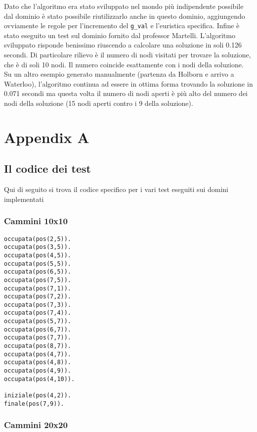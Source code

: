 Dato che l'algoritmo era stato sviluppato nel mondo più indipendente possibile dal dominio è stato possibile riutilizzarlo anche in questo dominio, aggiungendo ovviamente le regole per l'incremento del \lstinline{g_val} e l'euristica specifica. Infine è stato eseguito un test sul dominio fornito dal professor Martelli. L'algoritmo sviluppato risponde benissimo riuscendo a calcolare una soluzione in soli 0.126 secondi. Di particolare rilievo è il numero di nodi visitati per trovare la soluzione, che è di soli 10 nodi. Il numero coincide esattamente con i nodi della soluzione. Su un altro esempio generato manualmente (partenza da Holborn e arrivo a Waterloo), l'algoritmo continua ad essere in ottima forma trovando la soluzione in 0.071 secondi ma questa volta il numero di nodi aperti è più alto del numero dei nodi della soluzione (15 nodi aperti contro i 9 della soluzione).

\newpage

\appendix
\chapter{Appendix A}

\section{Il codice dei test}
Qui di seguito si trova il codice specifico per i vari test eseguiti sui domini implementati

\subsection{Cammini 10x10}

\begin{lstlisting}
occupata(pos(2,5)).
occupata(pos(3,5)).
occupata(pos(4,5)).
occupata(pos(5,5)).
occupata(pos(6,5)).
occupata(pos(7,5)).
occupata(pos(7,1)).
occupata(pos(7,2)).
occupata(pos(7,3)).
occupata(pos(7,4)).
occupata(pos(5,7)).
occupata(pos(6,7)).
occupata(pos(7,7)).
occupata(pos(8,7)).
occupata(pos(4,7)).
occupata(pos(4,8)).
occupata(pos(4,9)).
occupata(pos(4,10)).

iniziale(pos(4,2)).
finale(pos(7,9)).
\end{lstlisting}

\subsection{Cammini 20x20}

